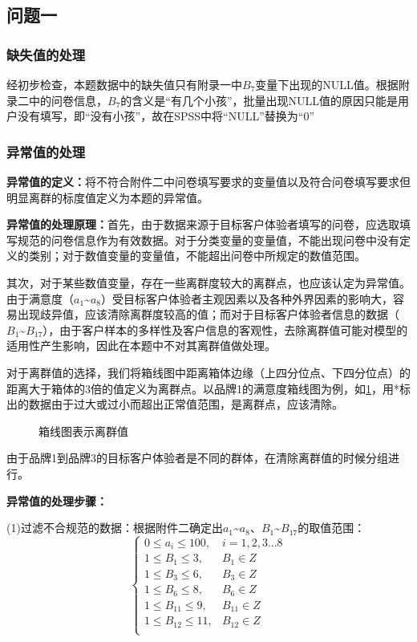 \documentclass{JXUSTmodeling}
\begin{document}
\subsection{问题一}\label{sub:5.1}
\subsubsection{缺失值的处理}
经初步检查，本题数据中的缺失值只有附录一中$ B_{7} $变量下出现的NULL值。根据附录二中的问卷信息，$ B_{7} $的含义是“有几个小孩”，批量出现NULL值的原因只能是用户没有填写，即“没有小孩”，故在SPSS中将“NULL”替换为“0”
\subsubsection{异常值的处理}
\textbf{异常值的定义：}将不符合附件二中问卷填写要求的变量值以及符合问卷填写要求但明显离群的标度值定义为本题的异常值。

\textbf{异常值的处理原理：}首先，由于数据来源于目标客户体验者填写的问卷，应选取填写规范的问卷信息作为有效数据。对于分类变量的变量值，不能出现问卷中没有定义的类别；对于数值变量的变量值，不能超出问卷中所规定的数值范围。

其次，对于某些数值变量，存在一些离群度较大的离群点，也应该认定为异常值。由于满意度（$ a_{1} $\~{}$ a_{8} $）受目标客户体验者主观因素以及各种外界因素的影响大，容易出现歧异值，应该清除离群度较高的值；而对于目标客户体验者信息的数据（$ B_{1} $\~{}$ B_{17} $），由于客户样本的多样性及客户信息的客观性，去除离群值可能对模型的适用性产生影响，因此在本题中不对其离群值做处理。

对于离群值的选择，我们将箱线图中距离箱体边缘（上四分位点、下四分位点）的距离大于箱体的3倍的值定义为离群点。以品牌1的满意度箱线图为例，如\ref{fig:1}，用*标出的数据由于过大或过小而超出正常值范围，是离群点，应该清除。
\begin{figure}[!htbp]
	\centering
	\caption{箱线图表示离群值}
	\label{fig:1}
\end{figure}

由于品牌1到品牌3的目标客户体验者是不同的群体，在清除离群值的时候分组进行。

\textbf{异常值的处理步骤：}

(1)过滤不合规范的数据：根据附件二确定出$ a_{1} $\~{}$ a_{8} $、$ B_{1} $\~{}$ B_{17} $的取值范围：
$$
\left\{
\begin{array}{ll}
0\leq a_{i} \leq 100,&i = 1,2,3...8 \\
1\leq B_{1}\leq 3,&B_{1}\in Z \\
1\leq B_{3}\leq 6,&B_{3}\in Z \\
1\leq B_{6}\leq 8,&B_{6}\in Z \\
1\leq B_{11}\leq 9,&B_{11}\in Z \\
1\leq B_{12}\leq 11,&B_{12}\in Z \\
\end{array}
\right.
$$
\end{document}
